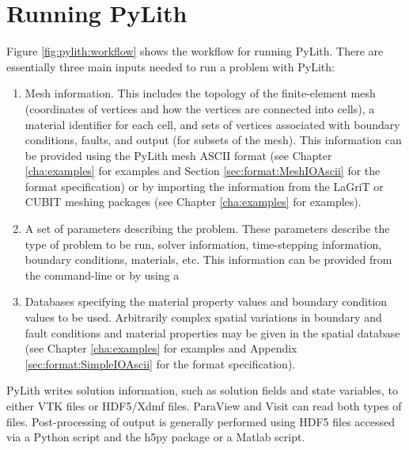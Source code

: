 
\chapter{Running PyLith}

Figure \vref{fig:pylith:workflow} shows the workflow for running PyLith.
There are essentially three main inputs needed to run a problem with
PyLith:
\begin{enumerate}
\item Mesh information. This includes the topology of the
  finite-element mesh (coordinates of vertices and how the vertices
  are connected into cells), a material identifier for each cell, and
  sets of vertices associated with boundary conditions, faults, and
  output (for subsets of the mesh). This information can be provided
  using the PyLith mesh ASCII format (see Chapter \vref{cha:examples}
  for examples and Section \vref{sec:format:MeshIOAscii} for the format
  specification) or by importing the information from the LaGriT or
  CUBIT meshing packages (see Chapter \vref{cha:examples} for
  examples).
\item A set of parameters describing the problem. These parameters
  describe the type of problem to be run, solver information,
  time-stepping information, boundary conditions, materials, etc. This
  information can be provided from the command-line or by using a
\item Databases specifying the material property values and boundary
  condition values to be used. Arbitrarily complex spatial variations
  in boundary and fault conditions and material properties may be
  given in the spatial database (see Chapter \vref{cha:examples} for
  examples and Appendix \vref{sec:format:SimpleIOAscii} for the
  format specification).
\end{enumerate}
PyLith writes solution information, such as solution fields and state
variables, to either VTK files or HDF5/Xdmf files. ParaView and Visit
can read both types of files. Post-processing of output is generally
performed using HDF5 files accessed via a Python script and the h5py
package or a Matlab script.

